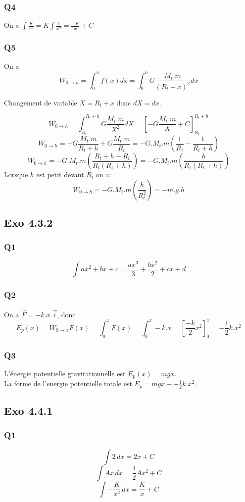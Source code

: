 \documentclass[]{book}
\theoremstyle{definition}
\begin{document}
\subsubsection{Q4}
On a $\int \frac{K}{x^2} = K \int \frac{1}{x^2} = \frac{-K}{x} + C$

\subsubsection{Q5}
On a 
$$W_{0 \to h} = \int_{0}^{h} f(x)dx = \int_{0}^{h} G\frac{M_t.m}{(R_t+x)^2} dx$$

Changement de variable $X=R_t+x$ donc $dX = dx$.

$$W_{0 \to h} = \int_{R_t}^{R_t+h} G\frac{M_t.m}{X^2} dX = [-G\frac{M_t.m}{X} + C]_{R_t}^{R_t+h}$$
$$W_{0 \to h} = -G\frac{M_t.m}{R_t+h} + G\frac{M_t.m}{R_t} = -G.M_t.m(\frac{1}{R_t} - \frac{1}{R_t+h})$$
$$W_{0 \to h} =  -G.M_t.m(\frac{R_t+h -R_t}{R_t(R_t+h)}) = -G.M_t.m(\frac{h}{R_t(R_t+h)})$$
Lorsque $h$ est petit devant $R_t$ on a:
$$W_{0 \to h} =  -G.M_t.m(\frac{h}{R_t^2}) = -m.g.h$$


\subsection*{Exo 4.3.2}
\subsubsection{Q1}
$$\int ax^2+bx+c = \frac{ax^3}{3} + \frac{bx^2}{2} + cx + d$$

\subsubsection{Q2}
On a $\overrightarrow{F} = -k.x.\overrightarrow{i}$, donc
$$E_p(x) = W_{0 \to x}F(x) = \int_0^x F(x) = \int_0^x -k.x = [\frac{-k}{2}x^2]_0^x = -\frac{1}{2}k.x^2$$

\subsubsection{Q3}
L'\'energie potentielle gravitationnelle est $E_p(x) = mgx$.\\
La forme de l'energie potentielle totale est $E_p = mgx - -\frac{1}{2}k.x^2$.

\subsection*{Exo 4.4.1}
\subsubsection{Q1}
$$\int 2\, dx = 2x +C $$
$$\int Ax\, dx = \frac{1}{2}A x^2 + C$$
$$\int -\frac{K}{x^2}\, dx = \frac{K}{x} + C$$
\end{document}

